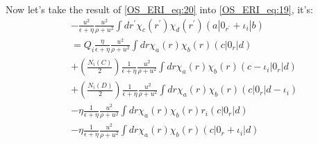 Now let's take the result of \ref{OS_ERI_eq:20} into \ref{OS_ERI_eq:19}, it's:
\begin{equation}
 \begin{split}
  &-\frac{u^{2}}{\epsilon+\eta}\frac{u^{2}}
{\rho+u^{2}}\int dr^{'} \chi_{c}(r^{'})\chi_{d}(r^{'})(a|0_{r^{'}}+\iota_{i}|b) \\
&=Q_{i}\frac{\eta}{\epsilon+\eta}\frac{u^{2}}
{\rho+u^{2}}\int dr \chi_{a}(r)\chi_{b}(r)(c|0_{r}|d) \\
&+
\left(\frac{N_{i}(C)}{2}\right)\frac{1}{\epsilon+\eta}\frac{u^{2}}
{\rho+u^{2}}\int dr \chi_{a}(r)\chi_{b}(r)(c-\iota_{i}|0_{r}|d) \\
&+
\left(\frac{N_{i}(D)}{2}\right)\frac{1}{\epsilon+\eta}\frac{u^{2}}
{\rho+u^{2}}\int dr \chi_{a}(r)\chi_{b}(r)(c|0_{r}|d-\iota_{i}) \\
&-\eta \frac{1}{\epsilon+\eta}\frac{u^{2}}
{\rho+u^{2}}\int dr \chi_{a}(r)\chi_{b}(r) r_{i} (c|0_{r}|d) \\
&-\eta\frac{1}{\epsilon+\eta}\frac{u^{2}}
{\rho+u^{2}}\int dr \chi_{a}(r)\chi_{b}(r)(c|0_{r}+\iota_{i}|d)
 \end{split}
\label{OS_ERI_eq:21}
\end{equation}

